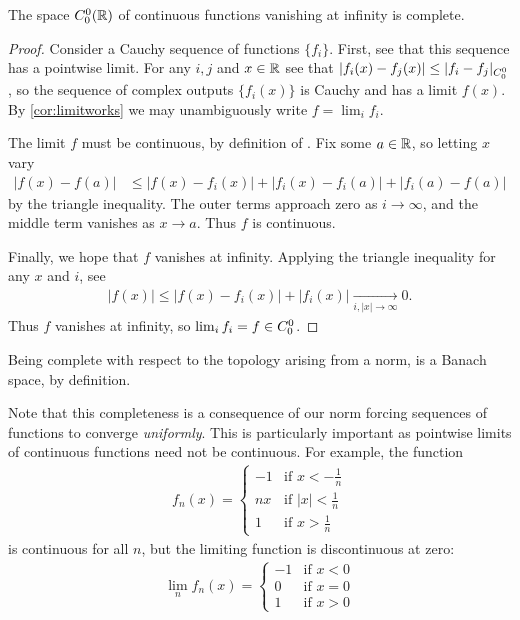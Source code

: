       \begin{thm}
        \label{thm:c00complete}
        The space ${C^0_0}(\mathbb{R})$ of continuous functions vanishing at infinity is complete.
      \end{thm}
      \begin{proof}
        Consider a Cauchy sequence of \Coo functions $\{f_i\}$.
        First, see that this sequence has a pointwise limit.
        For any $i,j$ and $x\in\mathbb{R}$ see that $|f_i(x)-f_j(x)| \le |f_i-f_j|_{C^0_0}$, so the sequence of complex outputs $\{f_i(x)\}$ is Cauchy and has a limit $f(x)$.
        By \cref{cor:limitworks} we may unambiguously write $f=\lim_i f_i$.

        The limit $f$ must be continuous, by definition of \Coo.
        Fix some $a\in\mathbb{R}$, so letting $x$ vary
        \begin{align*}
          |f(x)-f(a)|
          &\le |f(x)-f_i(x)|+|f_i(x)-f_i(a)|+|f_i(a)-f(a)|
        \end{align*}
        by the triangle inequality.
        The outer terms approach zero as $i\rightarrow\infty$, and the middle term vanishes as $x\rightarrow a$.
        Thus $f$ is continuous.

        Finally, we hope that $f$ vanishes at infinity.
        Applying the triangle inequality for any $x$ and $i$, see
        \begin{align*}
          |f(x)| \le |f(x)-f_i(x)| + |f_i(x)|
          \underset{i, |x|\rightarrow\infty}{\longrightarrow} 0\text{.}
        \end{align*}
        Thus $f$ vanishes at infinity, so $\lim_i f_i = f\in{C^0_0}$.
      \end{proof}
      \begin{cor}
        Being complete with respect to the topology arising from a norm, \Coo is a Banach space, by definition.
      \end{cor}
      \begin{rmk}
        Note that this completeness is a consequence of our norm forcing sequences of functions to converge \emph{uniformly}.
        This is particularly important as pointwise limits of continuous functions need not be continuous.
        For example, the function
        \begin{align*}
          f_n(x)=
          \begin{cases}
            -1 &\text{if } x<-\frac1n\\
            nx &\text{if } |x|<\frac1n\\
            1 &\text{if } x>\frac1n
          \end{cases}
        \end{align*}
        is continuous for all $n$, but the limiting function is discontinuous at zero:
        \begin{align*}
          \lim_nf_n(x)=
          \begin{cases}
            -1 &\text{if } x<0\\
            0 &\text{if } x=0\\
            1 &\text{if } x>0
          \end{cases}
        \end{align*}
      \end{rmk}


